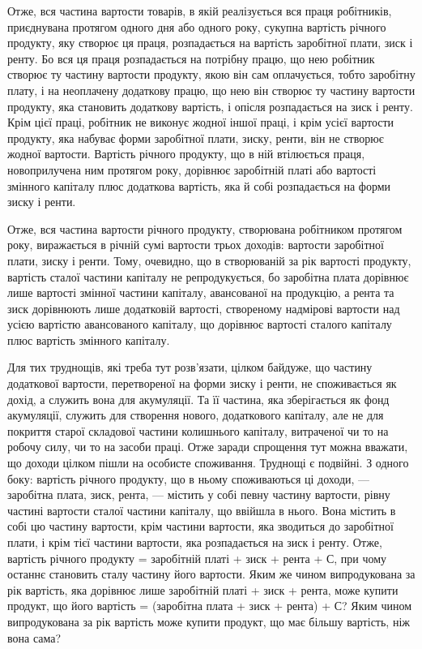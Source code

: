 
Отже, вся частина вартости товарів, в якій реалізується вся праця робітників,
приєднувана протягом одного дня або одного року, сукупна вартість річного
продукту, яку створює ця праця, розпадається на вартість заробітної плати,
зиск і ренту. Бо вся ця праця розпадається на потрібну працю, що нею робітник
створює ту частину вартости продукту, якою він сам оплачується, тобто заробітну
плату, і на неоплачену додаткову працю, що нею він створює ту частину
вартости продукту, яка становить додаткову вартість, і опісля розпадається на
зиск і ренту. Крім цієї праці, робітник не виконує жодної іншої праці, і крім
усієї вартости продукту, яка набуває форми заробітної плати, зиску, ренти, він
не створює жодної вартости. Вартість річного продукту, що в ній втілюється праця,
новоприлучена ним протягом року, дорівнює заробітній платі або вартості змінного
капіталу плюс додаткова вартість, яка й собі розпадається на форми зиску
і ренти.

Отже, вся частина вартости річного продукту, створювана робітником протягом
року, виражається в річній сумі вартости трьох доходів: вартости заробітної
плати, зиску і ренти. Тому, очевидно, що в створюваній за рік вартості
продукту, вартість сталої частини капіталу не репродукується, бо заробітна
плата дорівнює лише вартості змінної частини капіталу, авансованої на продукцію,
а рента та зиск дорівнюють лише додатковій вартості, створеному надмірові
вартости над усією вартістю авансованого капіталу, що дорівнює вартості
сталого капіталу плюс вартість змінного капіталу.

Для тих труднощів, які треба тут розв’язати, цілком байдуже, що частину
додаткової вартости, перетвореної на форми зиску і ренти, не споживається як
дохід, а служить вона для акумуляції. Та її частина, яка зберігається як фонд акумуляції, служить
для створення нового, додаткового капіталу, але не для покриття
старої складової частини колишнього капіталу, витраченої чи то на
робочу силу, чи то на засоби праці. Отже заради спрощення тут можна вважати,
що доходи цілком пішли на особисте споживання. Труднощі є подвійні.
З одного боку: вартість річного продукту, що в ньому споживаються ці
доходи, — заробітна плата, зиск, рента, — містить у собі певну частину вартости,
рівну частині вартости сталої частини капіталу, що ввійшла в нього. Вона містить
в собі цю частину вартости, крім частини вартости, яка зводиться до заробітної
плати, і крім тієї частини вартости, яка розпадається на зиск і ренту. Отже,
вартість річного продукту = заробітній платі + зиск + рента + С, при чому
останнє становить сталу частину його вартости. Яким же чином випродукована
за рік вартість, яка дорівнює лише заробітній платі + зиск + рента, може
купити продукт, що його вартість = (заробітна плата + зиск + рента) + С?
Яким чином випродукована за рік вартість може купити продукт, що має
більшу вартість, ніж вона сама?

